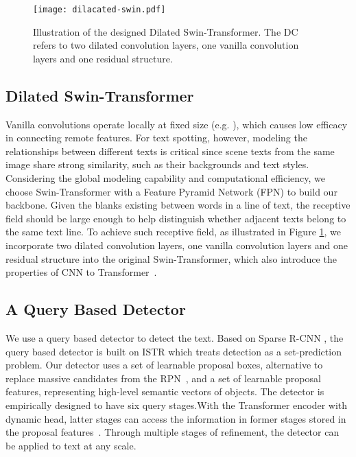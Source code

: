 \documentclass[10pt,twocolumn,letterpaper]{article}
\begin{document}
\begin{figure}[t]
    \centering
    \texttt{[image: dilacated-swin.pdf]}
    \caption{Illustration of the designed Dilated Swin-Transformer. The DC refers to two dilated convolution layers, one vanilla convolution layers and one residual structure.
    }
    \label{fig:Dilated Swin-Transformer}
\end{figure}

\subsection{Dilated Swin-Transformer}

Vanilla convolutions operate locally at fixed size (e.g. ), which causes low efficacy in connecting remote features. For text spotting, however, modeling the relationships between different texts is critical since scene texts from the same image share strong similarity, such as their backgrounds and text styles. Considering the global modeling capability and computational efficiency, we choose Swin-Transformer \cite{liu2021Swin} with a Feature Pyramid Network (FPN)\cite{lin2017feature} to build our backbone. 
Given the blanks existing between words in a line of text, the receptive field should be large enough to help distinguish whether adjacent texts belong to the same text line. To achieve such receptive field, as illustrated in Figure \ref{fig:Dilated Swin-Transformer}, 
we incorporate two dilated convolution layers\cite{YuKoltun2016}, one vanilla convolution layers and one residual structure into the original Swin-Transformer, which also introduce the properties of CNN to Transformer~\cite{wu2021cvt}.


\subsection{A Query Based Detector}
\label{sec:A Query Based Detector}
We use a query based detector to detect the text. Based on Sparse R-CNN \cite{sun2021sparse}, the query based detector is built on ISTR \cite{hu2021istr} which treats detection as a set-prediction problem. Our detector uses a set of learnable proposal boxes, alternative to replace massive candidates from the RPN~\cite{ren2015faster}, and a set of learnable proposal features, representing high-level semantic vectors of objects. 
The detector is empirically designed to have six query stages.With the Transformer encoder with dynamic head, latter stages can access the information in former stages stored in the proposal features~\cite{jia2016dynamic,tian2020conditional,sun2021sparse}.
Through multiple stages of refinement, the detector can be applied to text at any scale. 
\end{document}
